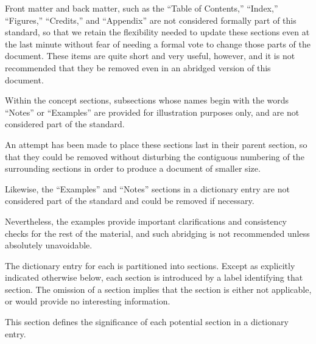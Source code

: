 \endlist

\endsubSection%



Front matter and back matter, such as the ``Table of Contents,'' 
``Index,'' ``Figures,'' ``Credits,'' and ``Appendix'' are not considered formally 
part of this standard, so that we retain the flexibility needed to update
these sections even at the last minute without fear of needing a formal 
vote to change those parts of the document.  These items are quite short 
and very useful, however, and it is not recommended that they be removed 
even in an abridged version of this document.

Within the concept sections, subsections whose names begin with 
the words ``Notes'' or ``Examples'' are provided for illustration 
purposes only, and are not considered part of the standard.

An attempt has been made to place these sections last in their parent section,
so that they could be removed without disturbing the contiguous numbering of the 
surrounding sections in order to produce a document of smaller size.

Likewise, the ``Examples'' and ``Notes'' sections in a dictionary entry
are not considered part of the standard and could be removed if necessary.

Nevertheless, the examples provide important clarifications and consistency 
checks for the rest of the material, and such abridging is not recommended
unless absolutely unavoidable.

\endsubsection%


The dictionary entry for each  is partitioned into
sections.  Except as explicitly indicated otherwise below, each section
is introduced by a label identifying that section.  The omission of a
section implies that the section is either not applicable, or would
provide no interesting information.

This section defines the significance of each potential section in a
dictionary entry.


